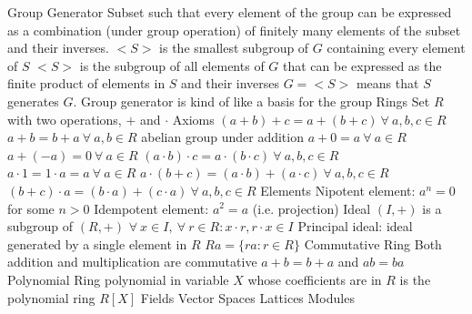 \documentclass[14pt]{extarticle}
\begin{document}
\begin{outline}
			\2	Group Generator
				\3	Subset such that every element of the group can be expressed as a 
						combination (under group operation) of finitely many elements of the
						subset and their inverses.
				\3	$<S>$ is the smallest subgroup of $G$ containing every element of $S$
				\3	$<S>$ is the subgroup of all elements of $G$ that can be expressed
						as the finite product of elements in $S$ and their inverses
				\3	$G = <S>$ means that $S$ generates $G$.
				\3	Group generator is kind of like a basis for the group	
		\1	Rings
			\2	Set $R$ with two operations, $+$ and $\cdot$ 
			\2	Axioms
				\3	$(a + b) + c = a + (b + c)~\forall~a,b,c \in R$ 
				\3	$a + b = b + a~\forall~a,b \in R$ abelian group under addition
				\3	$a + 0 = a~\forall~a \in R$
				\3	$a + (-a) = 0~\forall~a \in R$ 
				\3	$(a \cdot b) \cdot c = a \cdot (b \cdot c)~\forall~a,b,c \in R$
				\3	$a \cdot 1 = 1 \cdot a = a~\forall~a \in R$
				\3	$a \cdot (b + c) = (a \cdot b) + (a \cdot c)~\forall~a,b,c \in R$
				\3	$(b + c) \cdot a = (b \cdot a) + (c \cdot a)~\forall~a,b,c \in R$
			\2	Elements
				\3	Nipotent element:	$a^n = 0$ for some $n > 0$
				\3	Idempotent element:	$a^2 = a$ (i.e. projection)
			\2	Ideal
				\3	$(I,+)$ is a subgroup of $(R,+)$
				\3	$\forall~x \in I, ~\forall~r \in R:	x \cdot r, r \cdot x \in I$	
				\3	Principal ideal:	ideal generated by a single element in $R$
					\4	$Ra = \{ra : r \in R\}$
		\1	Commutative Ring
			\2	Both addition and multiplication are commutative
			\2	$a + b = b + a$ and $ab = ba$
			\2	Polynomial Ring 
				\3	polynomial in variable $X$ whose coefficients are in $R$ is the polynomial ring $R[X]$
		\1	Fields
		\1	Vector Spaces
		\1	Lattices
		\1	Modules
	
	
	\end{outline}
\end{document}
